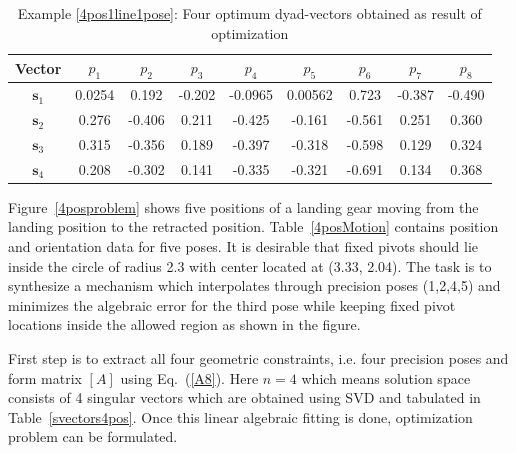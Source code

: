 \documentclass[twocolumn,10pt]{asme2ej}
\newcommand{\req}[1]{(\ref{#1})}
\begin{document}
\begin{table}[thb]
 \caption{Example \ref{4pos1line1pose}: Four optimum dyad-vectors obtained as result of optimization}
  \centering
  \begin{tabular}{ccccccccc}
  \hline
  Vector &$p_1$&$p_2$&$p_3$&$p_4$&$p_5$&$p_6$&$p_7$&$p_8$\\
    \hline
$\textbf{s}_1$&  0.0254 & 0.192 & -0.202 & -0.0965 & 0.00562 & 0.723 & -0.387 & -0.490 \\
$\textbf{s}_2$& 0.276 & -0.406 & 0.211 & -0.425 & -0.161 & -0.561 & 0.251 & 0.360 \\
$\textbf{s}_3$& 0.315 & -0.356 & 0.189 & -0.397 & -0.318 & -0.598 & 0.129 & 0.324 \\
$\textbf{s}_4$& 0.208 & -0.302 & 0.141 & -0.335 & -0.321 & -0.691 & 0.134 & 0.368 \\
    \hline
  \end{tabular}
  \label{dyadvectors4pos}
\end{table}

Figure~\ref{4posproblem} shows five positions of a landing gear moving from the landing position to the retracted position. Table~\ref{4posMotion} contains position and orientation data for five poses. It is desirable that fixed pivots should lie inside the circle of radius 2.3 with center located at (3.33, 2.04). The task is to synthesize a mechanism which interpolates through precision poses (1,2,4,5) and minimizes the algebraic error for the third pose while keeping fixed pivot locations inside the allowed region as shown in the figure.

First step is to extract all four geometric constraints, i.e. four precision poses and form matrix $[A]$  using Eq.~\req{A8}. Here $n = 4$ which means solution space consists of 4 singular vectors which are obtained using SVD and tabulated in Table~\ref{svectors4pos}. Once this linear algebraic fitting is done, optimization problem can be formulated.
\end{document}

